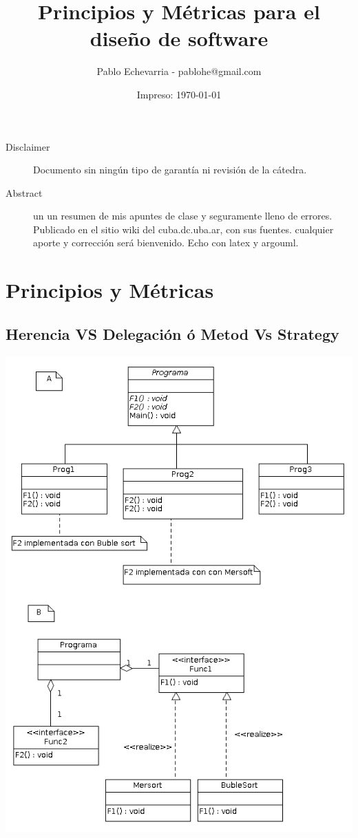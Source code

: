 \documentclass[10pt,a4paper]{article}
\title{Principios y Métricas para el diseño de software}
\author{Pablo Echevarria - pablohe@gmail.com}
\date{Impreso: \today}
\begin{document}
\maketitle


\begin{description}
\item [Disclaimer ]
Documento sin ningún tipo de garantía ni 
revisión de la cátedra.
\item[Abstract] un un resumen de mis apuntes de clase 
y seguramente lleno de errores. 
Publicado en el sitio wiki del cuba.dc.uba.ar, con sus fuentes.
cualquier aporte y corrección será bienvenido.
Echo con latex y argouml. 
\end{description}

\newpage

\tableofcontents
\newpage
  
\section{Principios y Métricas}
\subsection{Herencia VS Delegación ó Metod Vs Strategy}

\includegraphics[scale=0.6]{./img/F1F2.png} 
\end{document}

